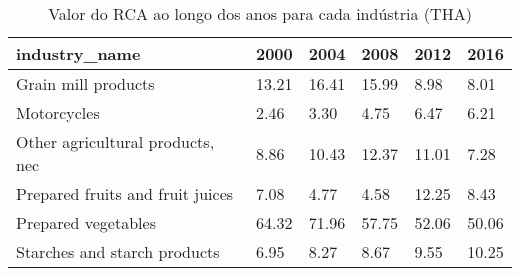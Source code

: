 \begin{table}
\centering
\caption{Valor do RCA ao longo dos anos para cada indústria (THA)}
\begin{tabular}{p{6cm}p{1.5cm}p{1.5cm}p{1.5cm}p{1.5cm}p{1.5cm}}
\toprule
                   industry\_name &  2000 &  2004 &  2008 &  2012 &  2016 \\
\midrule
             Grain mill products & 13.21 & 16.41 & 15.99 &  8.98 &  8.01 \\
                     Motorcycles &  2.46 &  3.30 &  4.75 &  6.47 &  6.21 \\
Other agricultural products, nec &  8.86 & 10.43 & 12.37 & 11.01 &  7.28 \\
Prepared fruits and fruit juices &  7.08 &  4.77 &  4.58 & 12.25 &  8.43 \\
             Prepared vegetables & 64.32 & 71.96 & 57.75 & 52.06 & 50.06 \\
    Starches and starch products &  6.95 &  8.27 &  8.67 &  9.55 & 10.25 \\
\bottomrule
\end{tabular}
\end{table}
